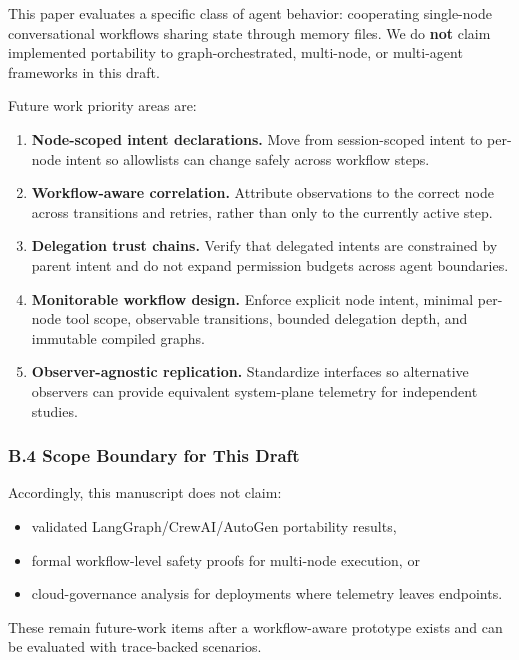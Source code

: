 \documentclass[
]{article}
\providecommand{\tightlist}{%
  \setlength{\itemsep}{0pt}\setlength{\parskip}{0pt}}
\begin{document}
This paper evaluates a specific class of agent behavior: cooperating
single-node conversational workflows sharing state through memory files.
We do \textbf{not} claim implemented portability to graph-orchestrated,
multi-node, or multi-agent frameworks in this draft.

Future work priority areas are:

\begin{enumerate}
\def\labelenumi{\arabic{enumi}.}
\tightlist
\item
  \textbf{Node-scoped intent declarations.} Move from session-scoped
  intent to per-node intent so allowlists can change safely across
  workflow steps.
\item
  \textbf{Workflow-aware correlation.} Attribute observations to the
  correct node across transitions and retries, rather than only to the
  currently active step.
\item
  \textbf{Delegation trust chains.} Verify that delegated intents are
  constrained by parent intent and do not expand permission budgets
  across agent boundaries.
\item
  \textbf{Monitorable workflow design.} Enforce explicit node intent,
  minimal per-node tool scope, observable transitions, bounded
  delegation depth, and immutable compiled graphs.
\item
  \textbf{Observer-agnostic replication.} Standardize interfaces so
  alternative observers can provide equivalent system-plane telemetry
  for independent studies.
\end{enumerate}

\subsubsection{B.4 Scope Boundary for This
Draft}\label{b.4-scope-boundary-for-this-draft}

Accordingly, this manuscript does not claim:

\begin{itemize}
\tightlist
\item
  validated LangGraph/CrewAI/AutoGen portability results,
\item
  formal workflow-level safety proofs for multi-node execution, or
\item
  cloud-governance analysis for deployments where telemetry leaves
  endpoints.
\end{itemize}

These remain future-work items after a workflow-aware prototype exists
and can be evaluated with trace-backed scenarios.
\end{document}
